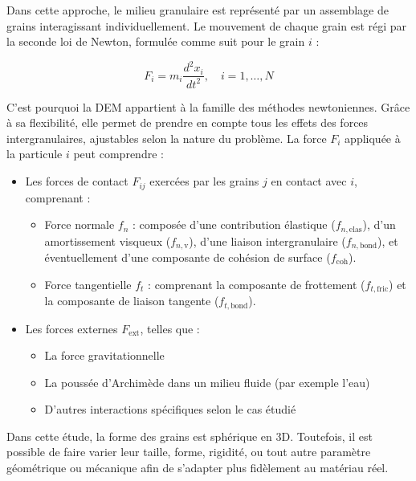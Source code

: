 \documentclass[a4paper,12pt]{report}
\begin{document}
Dans cette approche, le milieu granulaire est représenté par un assemblage de grains interagissant individuellement. Le mouvement de chaque grain est régi par la seconde loi de Newton, formulée comme suit pour le grain $i$ :

\[
F_i = m_i \dfrac{d^2x_i}{dt^2}, \quad i = 1,\dots,N
\]

C’est pourquoi la DEM appartient à la famille des méthodes newtoniennes. Grâce à sa flexibilité, elle permet de prendre en compte tous les effets des forces intergranulaires, ajustables selon la nature du problème. La force $F_i$ appliquée à la particule $i$ peut comprendre :

\begin{itemize}[label=$\bullet$]
    \item Les forces de contact $F_{ij}$ exercées par les grains $j$ en contact avec $i$, comprenant :
    \begin{itemize}[label=$\cdot$]
        \item Force normale $f_n$ : composée d’une contribution élastique ($f_{n,\mathrm{elas}}$), d’un amortissement visqueux ($f_{n,\mathrm{v}}$), d’une liaison intergranulaire ($f_{n,\mathrm{bond}}$), et éventuellement d’une composante de cohésion de surface ($f_{\mathrm{coh}}$).
        \item Force tangentielle $f_t$ : comprenant la composante de frottement ($f_{t,\mathrm{fric}}$) et la composante de liaison tangente ($f_{t,\mathrm{bond}}$).
    \end{itemize}
    
    \item Les forces externes $F_{\mathrm{ext}}$, telles que :
    \begin{itemize}[label=$\cdot$]
        \item La force gravitationnelle
        \item La poussée d’Archimède dans un milieu fluide (par exemple l’eau)
        \item D'autres interactions spécifiques selon le cas étudié
    \end{itemize}
\end{itemize}

Dans cette étude, la forme des grains est sphérique en 3D. Toutefois, il est possible de faire varier leur taille, forme, rigidité, ou tout autre paramètre géométrique ou mécanique afin de s’adapter plus fidèlement au matériau réel.
\end{document}
